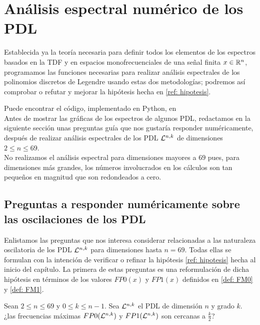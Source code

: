 \chapter{Análisis espectral numérico de los PDL}
\label{chap: resultados numericos analisis espectrales}

Establecida ya la teoría necesaria
para definir todos los elementos de los espectros
basados en la TDF y en espacios monofrecuenciales 
de una señal finita $x \in \mathbb{R}^{n}$,
programamos 
las funciones necesarias para realizar análisis espectrales
de los polinomios discretos de Legendre
usando estas dos metodologías; podremos así
comprobar o refutar y mejorar
la hipótesis hecha en 
\ref{ref: hipotesis}. 

Puede encontrar el código, implementado en Python,
en  \\

Antes de mostrar las gráficas de los espectros
de algunos PDL, 
redactamos en la siguiente sección unas preguntas guía
que nos gustaría responder numéricamente, después de 
realizar análisis espectrales de los PDL
$\mathcal{L}^{n,k}$ de dimensiones $2 \leq n \leq 69$. \\

No realizamos el análisis espectral para dimensiones
mayores a $69$ pues, para dimensiones más grandes, los números
involucrados en los cálculos son tan pequeños
en magnitud que son redondeados a cero.

\section{Preguntas a responder numéricamente sobre las oscilaciones de los PDL}

Enlistamos las preguntas que nos interesa considerar
relacionadas a las naturaleza oscilatoria
de los PDL $\mathcal{L}^{n,k}$
para dimensiones hasta $n=69$. 
Todas ellas se formulan con la intención de 
verificar o refinar la 
hipótesis \ref{ref: hipotesis} 
hecha al inicio del capítulo. La primera
de estas preguntas es una reformulación
de dicha hipótesis
en términos de los 
valores $FP0(x)$ y $FP1(x)$ definidos en 
\ref{def: FM0} y \ref{def: FM1}.

\begin{pregunta}
\label{pregunta 1}
Sean $2 \leq n \leq 69$ y $0 \leq k \leq n-1$.
Sea $\mathcal{L}^{n,k}$ el PDL de dimensión $n$ y grado $k$.
¿las frecuencias máximas
$FP0(\mathcal{L}^{n,k})$ y 
$FP1(\mathcal{L}^{n,k})$ son cercanas a $\frac{k}{2}$?
\end{pregunta}

